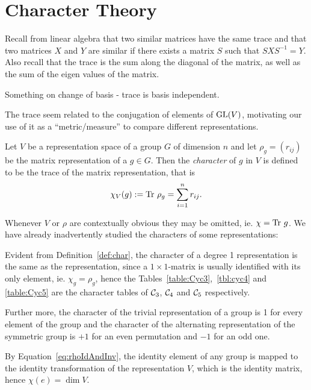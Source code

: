 \clearpage{\thispagestyle{empty}}
\section{Character Theory}

Recall from linear algebra that two similar matrices have the same trace \cite[Thm 5.4.]{Holst} and that two matrices $X$ and $Y$ are similar if there exists a matrix $S$ such that $S X S^{-1} = Y$. Also recall that the trace is the sum along the diagonal of the matrix, as well as the sum of the eigen values of the matrix.

Something on change of basis - trace is basis independent.

The trace seem related to the conjugation of elements of $\text{GL}(V)$, motivating our use of it as a ``metric/measure'' to compare different representations. 

\begin{definition}\label{def:char}
	 Let $V$ be a representation space of a group $G$ of dimension $n$ and let $\rho_g = (r_{ij})$ be the matrix representation of a $g \in G$. Then the \emph{character} of $g$ in $V$ is defined to be the trace of the matrix representation, that is 
	 \begin{align*}
	 	\chi_V(g) := \text{Tr } \rho_g = \sum_{i=1}^{n} r_{ij}.
	 \end{align*}
\end{definition}

Whenever $V$ or $\rho$ are contextually obvious they may be omitted, ie. $\chi = \text{Tr } g$. We have already inadvertently studied the characters of some representations:

\begin{example}
	Evident from Definition~\ref{def:char}, the character of a degree 1 representation is the same as the representation, since a $1 \times 1$-matrix is usually identified with its only element, ie. $\chi_g = \rho_g$, hence the Tables~\ref{table:Cyc3},~\ref{tbl:cyc4} and \ref{table:Cyc5} are the character tables of $\mathcal{C}_3$, $\mathcal{C}_4$ and $\mathcal{C}_5$ respectively.
	
	Further more, the character of the trivial representation of a group is 1 for every element of the group and the character of the alternating representation of the symmetric group is $+1$ for an even permutation and $-1$ for an odd one.
\end{example}

\begin{example}
	By Equation~\ref{eq:rhoIdAndInv}, the identity element of any group is mapped to the identity transformation of the representation $V$, which is the identity matrix, hence $\chi(e) = \dim V$.
\end{example}

